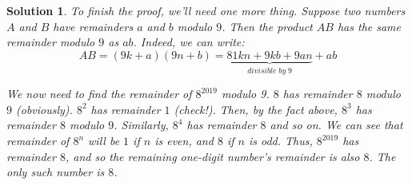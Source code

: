 \documentclass[a4paper,12pt]{article}
\theoremstyle{perfect}
\newtheorem{sol}{Solution}
\begin{document}
\begin{sol}
To finish the proof, we'll need one more thing. Suppose two numbers $A$ and $B$ have remainders $a$ and $b$ modulo $9$. Then the product $AB$ has the same remainder modulo $9$ as $ab$. Indeed, we can write:
$$AB = (9k + a)(9n +b) = \underbrace{81kn + 9kb + 9an}_{divisible \; by \; 9} + ab$$


We now need to find the remainder of $8^{2019}$ modulo 9.
$8$ has remainder $8$ modulo $9$ (obviously). $8^2$ has remainder $1$ (check!). Then, by the fact above, $8^3$ has remainder $8$ modulo $9$. Similarly, $8^4$ has remainder $8$ and so on. We can see that remainder of $8^{n}$ will be $1$ if $n$ is even, and $8$ if $n$ is odd. Thus, $8^{2019}$ has remainder $8$, and so the remaining one-digit number's remainder is also $8$. The only such number is $8$.
\end{sol}
	
\end{document}

